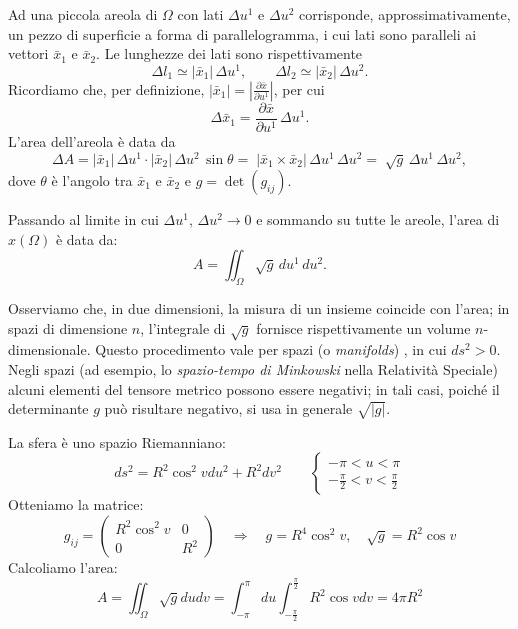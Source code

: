 Ad una piccola areola di $\Omega$ con lati $\Delta u^1$ e $\Delta u^2$ corrisponde, approssimativamente, un pezzo di superficie a forma di parallelogramma, i cui lati sono paralleli ai vettori $\bar x_1$ e $\bar x_2$. Le lunghezze dei lati sono rispettivamente
$$
\Delta l_1 \simeq |\bar x_1|\,\Delta u^1,\qquad \Delta l_2 \simeq |\bar x_2|\,\Delta u^2.
$$
Ricordiamo che, per definizione, $|\bar x_1| = \left|\frac{\partial \bar x}{\partial u^1}\right|$, per cui
\vspace{0.4em}
$$
\Delta \bar x_1 = \frac{\partial \bar x}{\partial u^1}\,\Delta u^1.
$$
L'area dell'areola è data da
\vspace{0.4em}
$$
\Delta A = |\bar x_1|\,\Delta u^1 \cdot |\bar x_2|\,\Delta u^2\,\sin\theta 
=\; |\bar x_1 \times \bar x_2|\,\Delta u^1\,\Delta u^2
=\; \sqrt{g}\,\Delta u^1\,\Delta u^2,
$$
dove $\theta$ è l'angolo tra $\bar x_1$ e $\bar x_2$ e $g = \det(g_{ij})$.

Passando al limite in cui $\Delta u^1,\,\Delta u^2 \to 0$ e sommando su tutte le areole, l'area di $x(\Omega)$ è data da:
\vspace{0.4em}
$$
A = \iint_{\Omega} \sqrt{g}\,du^1\,du^2.
$$

Osserviamo che, in due dimensioni, la misura di un insieme coincide con l'area; in spazi di dimensione $n$, l'integrale di $\sqrt{g}$ fornisce rispettivamente un volume $n$-dimensionale. Questo procedimento vale per spazi (o \emph{manifolds}) , in cui $ds^2>0$. Negli spazi  (ad esempio, lo \emph{spazio-tempo di Minkowski} nella Relatività Speciale) alcuni elementi del tensore metrico possono essere negativi; in tali casi, poiché il determinante $g$ può risultare negativo, si usa in generale $\sqrt{|g|}$.

\begin{exampleblock}[Sfera]
    La sfera è uno spazio Riemanniano:
    $$
    ds^2 = R^2 \cos^2 v du^2 + R^2 dv^2
    \qquad
    \begin{cases}
    - \pi < u < \pi \\
    - \frac{\pi}{2} < v < \frac{\pi}{2}
    \end{cases}
    $$
    Otteniamo la matrice:
    $$
    g_{ij} = \begin{pmatrix}
        R^2 \cos^2 v & 0 \\
        0 & R^2
    \end{pmatrix}
    \quad \Rightarrow \quad
    g = R^4 \cos^2 v, \quad \sqrt{g} = R^2 \cos v
    $$
    Calcoliamo l'area:
    $$
    A = \iint_{\Omega} \sqrt{g} du dv = \int_{-\pi}^{\pi} du \int_{-\frac{\pi}{2}}^{\frac{\pi}{2}} R^2 \cos v dv = \boxed{4 \pi R^2}
    $$
\end{exampleblock}

